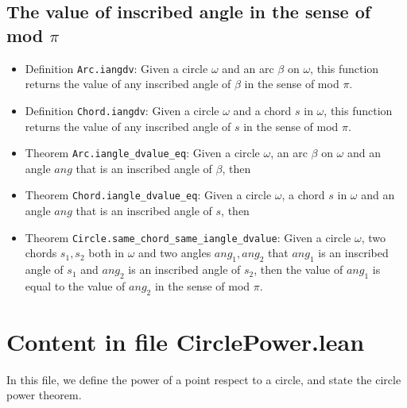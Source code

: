 \documentclass[12pt]{amsart}
\begin{document}
\subsection{The value of inscribed angle in the sense of mod $\pi$}
\begin{itemize}
    \item Definition \verb|Arc.iangdv|: Given a circle $\omega$ and an arc $\beta$ on $\omega$, this function returns the value of any inscribed angle of $\beta$ in the sense of mod $\pi$.
    \item Definition \verb|Chord.iangdv|: Given a circle $\omega$ and a chord $s$ in $\omega$, this function returns the value of any inscribed angle of $s$ in the sense of mod $\pi$.
    \item Theorem \verb|Arc.iangle_dvalue_eq|: Given a circle $\omega$, an arc $\beta$ on $\omega$ and an angle $ang$ that is an inscribed angle of $\beta$, then
    \item Theorem \verb|Chord.iangle_dvalue_eq|: Given a circle $\omega$, a chord $s$ in $\omega$ and an angle $ang$ that is an inscribed angle of $s$, then
    \item Theorem \verb|Circle.same_chord_same_iangle_dvalue|: Given a circle $\omega$, two chords $s_1,s_2$ both in $\omega$ and two angles $ang_1, ang_2$ that $ang_1$ is an inscribed angle of $s_1$ and $ang_2$ is an inscribed angle of $s_2$, then the value of $ang_1$ is equal to the value of $ang_2$ in the sense of mod $\pi$.
\end{itemize}


\section{Content in file CirclePower.lean}
In this file, we define the power of a point respect to a circle, and state the circle power theorem.
\end{document}
